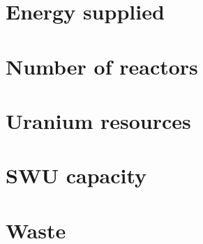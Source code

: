 \section{Energy supplied}

\section{Number of reactors}

\section{Uranium resources}

\section{SWU capacity}

\section{Waste}